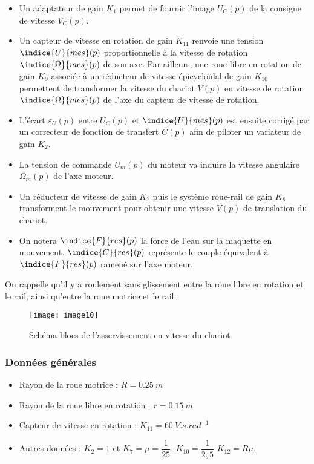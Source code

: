 \begin{itemize}
\item Un adaptateur de gain $K_1$ permet de fournir l'image $U_C (p)$ de la consigne de vitesse $V_C (p)$.
\item Un capteur de vitesse en rotation de gain $K_{11}$ renvoie une tension $\indice{U}{mes}(p)$ proportionnelle à la vitesse de rotation $\indice{\Omega}{mes} (p)$ de son axe. Par ailleurs, une roue libre en rotation de gain $K_9$ associée à un réducteur de vitesse épicycloïdal de gain $K_{10}$ permettent de transformer la vitesse du chariot $V(p)$ en vitesse de rotation $\indice{\Omega}{mes} (p)$ de l'axe du capteur de vitesse de rotation.
\item L'écart $\varepsilon_U (p)$ entre $U_C (p)$ et $\indice{U}{mes} (p)$ est ensuite corrigé par un correcteur de fonction de transfert $C(p)$ afin de piloter un variateur de gain $K_2$.
\item La tension de commande $U_m (p)$ du moteur va induire la vitesse angulaire $\Omega_m (p)$ de l'axe moteur.
\item Un réducteur de vitesse de gain $K_7$ puis le système roue-rail de gain $K_8$ transforment le mouvement pour obtenir une vitesse $V(p)$ de translation du chariot.
\item On notera $\indice{F}{res} (p)$ la force de l'eau sur la maquette en mouvement. $\indice{C}{res} (p)$ représente le couple équivalent à $\indice{F}{res} (p)$ ramené sur l'axe moteur.
\end{itemize}
On rappelle qu'il y a roulement sans glissement entre la roue libre en rotation et le rail, ainsi qu’entre la roue motrice et le rail.
 
\begin{figure}[!h]
\centering
\texttt{[image: image10]}
\caption{ \label{fig:CCMP:2021:10} Schéma-blocs de l'asservissement en vitesse du chariot}
\end{figure} 

\subsubsection*{Données générales}
 
 \begin{itemize}
\item Rayon de la roue motrice :	$R=\SI{0,25}{m}$
\item Rayon de la roue libre en rotation : $r=\SI{0,15}{m}$
\item Capteur de vitesse en rotation : $K_{11}=\SI{60}{V.s.rad^{-1}}$
\item Autres données : $K_2=1$ et $K_7=\mu=\dfrac{1}{25}$, $K_{10}=\dfrac{1}{2,5}$	$K_{12}=R\mu$.
 \end{itemize}
 
